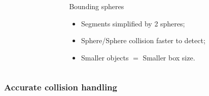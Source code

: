 \documentclass[aspectratio=1610,t,10pt]{beamer}
\begin{document}
\begin{frame}
\begin{columns}[c]
\begin{column}{.48\textwidth}
	\end{column}
	\begin{column}{.48\textwidth}
		\begin{block}{Bounding spheres}
			\begin{itemize}
				\item Segments simplified by 2 spheres;
				\item Sphere/Sphere collision faster to detect;
				\item Smaller objects $=$ Smaller box size.					
			\end{itemize}				
		\end{block}
	\end{column}
\end{columns}
\end{frame}

\subsubsection{Accurate collision handling}
\end{document}
